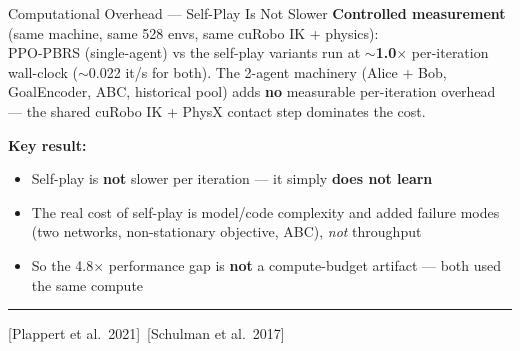 \documentclass[aspectratio=169,xcolor=dvipsnames,t]{beamer}
\newcommand{\litfooter}[1]{%
  \vspace{2pt}%
  \hrule%
  \vspace{2pt}%
  {\tiny\color{LightDarkGrey} #1}%
}
\begin{document}

\begin{frame}[t]{Computational Overhead — Self-Play Is Not Slower}
  \textbf{Controlled measurement} (same machine, same 528 envs, same cuRobo IK + physics): \\
  PPO-PBRS (single-agent) vs the self-play variants run at \textcolor{hlgreen}{\textbf{$\sim$1.0$\times$}} per-iteration wall-clock ($\sim$0.022 it/s for both). The 2-agent machinery (Alice + Bob, GoalEncoder, ABC, historical pool) adds \textbf{no} measurable per-iteration overhead — the shared cuRobo IK + PhysX contact step dominates the cost.

  \vspace{4pt}
  \textbf{Key result:}
  \begin{itemize}
    \item Self-play is \textbf{not} slower per iteration — it simply \textbf{does not learn}
    \item The real cost of self-play is model/code complexity and added failure modes (two networks, non-stationary objective, ABC), \emph{not} throughput
    \item So the 4.8$\times$ performance gap is \textbf{not} a compute-budget artifact — both used the same compute
  \end{itemize}

  \vfill\litfooter{[Plappert et al.\ 2021]~[Schulman et al.\ 2017]}
\end{frame}
\end{document}
